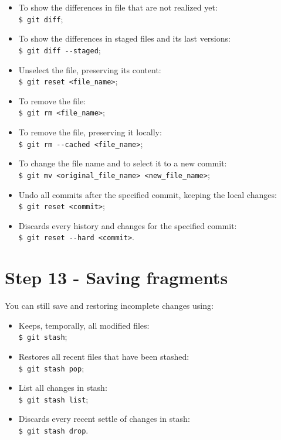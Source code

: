 \documentclass[12pt,a4paper,titlepage,brazil]{article}
\begin{document}
{\begin{itemize}
 \item To show the differences in file that are not realized yet:\\
   \texttt{\$ git diff};
 \item To show the differences in staged files and its last versions:\\
   \texttt{\$ git diff -\hspace{0.01cm}-staged};
 \item Unselect the file, preserving its content:\\
   \texttt{\$ git reset <file\_name>};
 \item To remove the file:\\
   \texttt{\$ git rm <file\_name>};
 \item To remove the file, preserving it locally:\\
   \texttt{\$ git rm -\hspace{0.01cm}-cached <file\_name>};
 \item To change the file name and to select it to a new commit:\\
   \texttt{\$ git mv <original\_file\_name> <new\_file\_name>};
 \item Undo all commits after the specified commit, keeping the local changes:\\
   \texttt{\$ git reset <commit>};   
 \item Discards every history and changes for the specified commit:\\
   \texttt{\$ git reset -\hspace{0.01cm}-hard <commit>}.   
\end{itemize}  


\section{Step 13 - Saving fragments}

You can still save and restoring incomplete changes using:

\begin{itemize}
 \item Keeps, temporally, all modified files:\\
   \texttt{\$ git stash};
 \item Restores all recent files that have been stashed:\\
   \texttt{\$ git stash pop};
 \item List all changes in stash:\\
   \texttt{\$ git stash list};
 \item Discards every recent settle of changes in stash:\\
   \texttt{\$ git stash drop}.
\end{itemize}  

}
\end{document}
